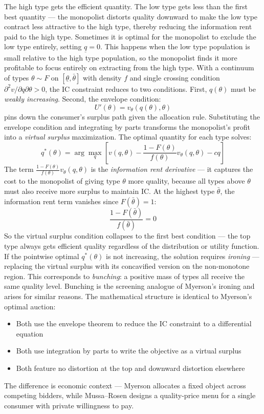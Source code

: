 \documentclass[11pt,english]{article}
\begin{document}
The high type gets the efficient quantity. The low type gets less than the first best quantity --- the monopolist distorts quality downward to make the low type contract less attractive to the high type, thereby reducing the information rent paid to the high type. Sometimes it is optimal for the monopolist to exclude the low type entirely, setting $\underline{q} = 0$. This happens when the low type population is small relative to the high type population, so the monopolist finds it more profitable to focus entirely on extracting from the high type. With a continuum of types $\theta \sim F$ on $[\underline{\theta}, \bar{\theta}]$ with density $f$ and single crossing condition $\partial^2 v / \partial q \partial \theta > 0$, the IC constraint reduces to two conditions. First, $q(\theta)$ must be \textit{weakly increasing}. Second, the envelope condition:
\begin{equation}
    U'(\theta) = v_\theta(q(\theta), \theta)
\end{equation}
pins down the consumer's surplus path given the allocation rule. Substituting the envelope condition and integrating by parts transforms the monopolist's profit into a \textit{virtual surplus} maximization. The optimal quantity for each type solves:
\begin{equation}
    q^*(\theta) = \arg\max_q \left[v(q,\theta) - \frac{1-F(\theta)}{f(\theta)} v_\theta(q,\theta) - cq\right]
\end{equation}
The term $\frac{1-F(\theta)}{f(\theta)} v_\theta(q,\theta)$ is the \textit{information rent derivative} --- it captures the cost to the monopolist of giving type $\theta$ more quality, because all types above $\theta$ must also receive more surplus to maintain IC. At the highest type $\bar{\theta}$, the information rent term vanishes since $F(\bar{\theta}) = 1$:
\begin{equation}
    \frac{1 - F(\bar{\theta})}{f(\bar{\theta})} = 0
\end{equation}
So the virtual surplus condition collapses to the first best condition --- the top type always gets efficient quality regardless of the distribution or utility function. If the pointwise optimal $q^*(\theta)$ is not increasing, the solution requires \textit{ironing} --- replacing the virtual surplus with its concavified version on the non-monotone region. This corresponds to \textit{bunching}: a positive mass of types all receive the same quality level. Bunching is the screening analogue of Myerson's ironing and arises for similar reasons. The mathematical structure is identical to Myerson's optimal auction:
\begin{itemize}
    \item Both use the envelope theorem to reduce the IC constraint to a differential equation
    \item Both use integration by parts to write the objective as a virtual surplus
    \item Both feature no distortion at the top and downward distortion elsewhere
\end{itemize}
The difference is economic context --- Myerson allocates a fixed object across competing bidders, while Mussa--Rosen designs a quality-price menu for a single consumer with private willingness to pay.
\end{document}
